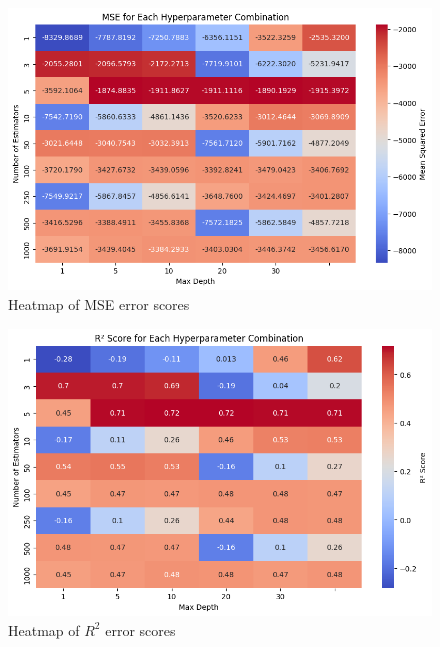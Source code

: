 \documentclass[a4paper]{article}
\begin{document}
\noindent
\begin{minipage}{0.49\textwidth} 
\begin{figure}[H]
    \centering
    \includegraphics[width=\textwidth]{./images/gbr_mse.jpg}
    \caption{Heatmap of MSE error scores}
\end{figure}
\end{minipage}
\begin{minipage}{0.49\textwidth} 
\begin{figure}[H]
    \centering
    \includegraphics[width=\textwidth]{./images/gbr_r2.jpg}
    \caption{Heatmap of $R^2$ error scores}
\end{figure}
\end{minipage}
\end{document}
